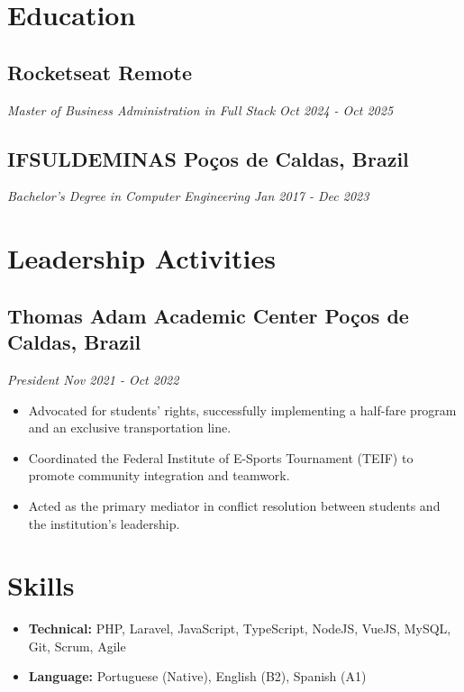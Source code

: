 \documentclass[a4paper,10pt]{article}
\begin{document}
\section{Education}
    \subsection*{\texorpdfstring{
        \textbf{Rocketseat} \hfill Remote
        }{
        Rocketseat -- Remote 
        }}
    \textit{Master of Business Administration in Full Stack \hfill Oct 2024 - Oct 2025}
    \subsection*{\texorpdfstring{
        \textbf{IFSULDEMINAS} \hfill Poços de Caldas, Brazil
        }{
        IFSULDEMINAS -- Poços de Caldas, Brazil
        }}
    \textit{Bachelor's Degree in Computer Engineering \hfill Jan 2017 - Dec 2023}

\section{Leadership Activities} 
    \subsection*{\texorpdfstring{
        \textbf{Thomas Adam Academic Center} \hfill Poços de Caldas, Brazil
        }{
        Thomas Adam Academic Center -- Poços de Caldas, Brazil
        }}
    \textit{President \hfill Nov 2021 - Oct 2022}
        \begin{itemize}
            \item Advocated for students' rights, successfully implementing a half-fare program and an exclusive transportation line.
            \item Coordinated the Federal Institute of E-Sports Tournament (TEIF) to promote community integration and teamwork.
            \item Acted as the primary mediator in conflict resolution between students and the institution's leadership.
        \end{itemize}

\section{Skills}
    \begin{itemize}
        \item \textbf{Technical:} PHP, Laravel, JavaScript, TypeScript, NodeJS, VueJS, MySQL, Git, Scrum, Agile
        \item \textbf{Language:} Portuguese (Native), English (B2), Spanish (A1)
    \end{itemize}
\end{document}

